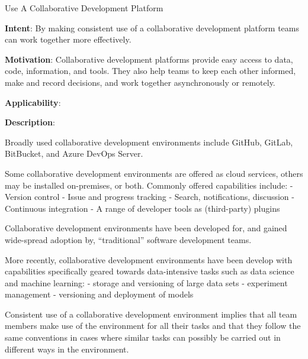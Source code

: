   
  \begin{frame}[plain]{ Use A Collaborative Development Platform
 }

  \textbf{Intent}: By making consistent use of a collaborative development platform teams can work together more effectively. 
 

  \textbf{Motivation}: Collaborative development platforms provide easy access to data, code, information, and tools. They also help teams to keep each other informed, make and record decisions, and work together asynchronously or remotely. 
 

  \textbf{Applicability}: 
 

  \textbf{Description}: 

Broadly used collaborative development environments include GitHub, GitLab, BitBucket, and Azure DevOps Server.


Some collaborative development environments are offered as cloud services, others may be installed on-premises, or both. Commonly offered capabilities include:
- Version control
- Issue and progress tracking
- Search, notifications, discussion
- Continuous integration
- A range of developer tools as (third-party) plugins


Collaborative development environments have been developed for, and gained wide-spread adoption by, ``traditional'' software development teams.


More recently, collaborative development environments have been develop with capabilities specifically geared towards data-intensive tasks such as data science and machine learning:
- storage and versioning of large data sets
- experiment management
- versioning and deployment of models


Consistent use of a collaborative development environment implies that all team members make use of the environment for all their tasks and that they follow the same conventions in cases where similar tasks can possibly be carried out in different ways in the environment.


 


  \end{frame}


